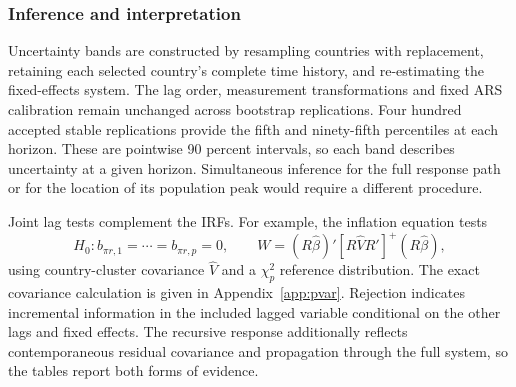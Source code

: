 \subsubsection{Inference and interpretation}
Uncertainty bands are constructed by resampling countries with replacement, retaining each selected country's complete time history, and re-estimating the fixed-effects system. The lag order, measurement transformations and fixed ARS calibration remain unchanged across bootstrap replications. Four hundred accepted stable replications provide the fifth and ninety-fifth percentiles at each horizon. These are pointwise 90 percent intervals, so each band describes uncertainty at a given horizon. Simultaneous inference for the full response path or for the location of its population peak would require a different procedure.

Joint lag tests complement the IRFs. For example, the inflation equation tests
\begin{equation}
 H_0:b_{\pi r,1}=\cdots=b_{\pi r,p}=0,\qquad
 W=(R\widehat\beta)'[R\widehat V R']^+(R\widehat\beta),\label{eq:wald}
\end{equation}
using country-cluster covariance $\widehat V$ and a $\chi_p^2$ reference distribution. The exact covariance calculation is given in Appendix~\ref{app:pvar}. Rejection indicates incremental information in the included lagged variable conditional on the other lags and fixed effects. The recursive response additionally reflects contemporaneous residual covariance and propagation through the full system, so the tables report both forms of evidence.
